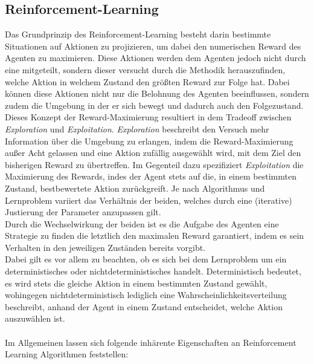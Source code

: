 \subsection{Reinforcement-Learning}
\label{subsec:rl}
Das Grundprinzip des Reinforcement-Learning besteht darin bestimmte Situationen auf Aktionen zu projizieren, um dabei den numerischen Reward des Agenten zu maximieren. Diese Aktionen werden dem Agenten jedoch nicht durch eine  mitgeteilt, sondern dieser versucht durch die  Methodik herauszufinden, welche Aktion in welchem Zustand  den größten Reward zur Folge hat. Dabei können diese Aktionen nicht nur die Belohnung des Agenten beeinflussen, sondern zudem die Umgebung in der er sich bewegt und dadurch auch den Folgezustand. \\
Dieses Konzept der Reward-Maximierung resultiert in dem Tradeoff zwischen \textit{Exploration} und \textit{Exploitation}. \textit{Exploration} beschreibt den Versuch mehr Information über die Umgebung zu erlangen, indem die Reward-Maximierung außer Acht gelassen und eine Aktion zufällig ausgewählt wird, mit dem Ziel den bisherigen Reward zu übertreffen. Im Gegenteil dazu spezifiziert \textit{Exploitation} die Maximierung des Rewards, indes der Agent stets auf die, in einem bestimmten Zustand, bestbewertete Aktion zurückgreift.
Je nach Algorithmus und Lernproblem variiert das Verhältnis der beiden, welches durch eine (iterative) Justierung der Parameter anzupassen gilt. \\
Durch die Wechselwirkung der beiden ist es die Aufgabe des Agenten eine Strategie zu finden die letztlich den maximalen Reward garantiert, indem es sein Verhalten in den jeweiligen Zuständen bereits vorgibt. \\
Dabei gilt es vor allem zu beachten, ob es sich bei dem Lernproblem um ein deterministisches oder nichtdeterministisches handelt. Deterministisch bedeutet, es wird stets die gleiche Aktion in einem bestimmten Zustand gewählt, wohingegen nichtdeterministisch lediglich eine Wahrscheinlichkeitsverteilung beschreibt, anhand der Agent in einem Zustand entscheidet, welche Aktion auszuwählen ist. \\\\
Im Allgemeinen lassen sich folgende inhärente Eigenschaften an Reinforcement Learning Algorithmen feststellen:
